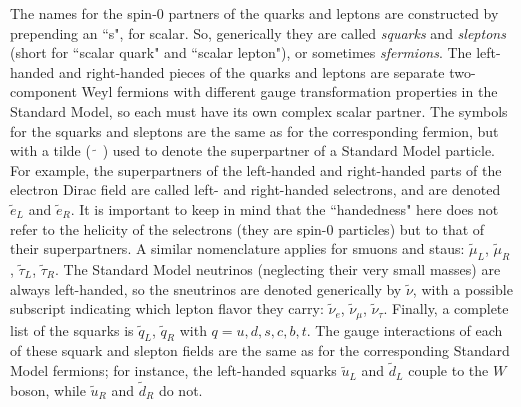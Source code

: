 \documentclass[12pt]{article}
\def\stilde{\widetilde}
\begin{document}
The names 
for the spin-0 partners of the quarks and leptons are constructed by 
prepending an ``s", for scalar. So, generically they are called {\it 
squarks} and {\it sleptons} (short for ``scalar quark" and ``scalar 
lepton"), or sometimes {\it sfermions}. 
The left-handed and right-handed pieces of the quarks and 
leptons are separate two-component Weyl fermions with different gauge 
transformation properties in the Standard Model, so each must have its own 
complex scalar partner. The symbols for the squarks and sleptons are the 
same as for the corresponding fermion, but with a tilde 
($\phantom{.}\stilde{\phantom{.}}\phantom{.}$) 
used to denote the superpartner of a Standard 
Model particle. For example, the superpartners of the left-handed and 
right-handed parts of the electron Dirac field are called left- and 
right-handed selectrons, and are denoted $\stilde e_L$ and $\stilde e_R$. 
It is important to keep in mind that the ``handedness" here does not refer 
to the helicity of the selectrons (they are spin-0 particles) but to that 
of their superpartners. A similar nomenclature applies for smuons and 
staus: $\stilde \mu_L$, $\stilde\mu_R$, $\stilde\tau_L$, $\stilde \tau_R$. 
The Standard Model neutrinos (neglecting their very small masses) are 
always left-handed, so the sneutrinos are denoted generically by 
$\stilde\nu$, with a possible subscript indicating which lepton flavor 
they carry: $\stilde\nu_e$, $\stilde\nu_\mu$, $\stilde\nu_\tau$. Finally, 
a complete list of the squarks is $\stilde q_L$, $\stilde q_R$ with 
$q=u,d,s,c,b,t$. The gauge interactions of each of these squark and 
slepton fields are the same as for the corresponding Standard Model 
fermions; for instance, the left-handed squarks $\stilde u_L$ and $\stilde 
d_L$ couple to the $W$ boson, while $\stilde u_R$ and $\stilde d_R$ do 
not.\setcounter{footnote}{1}
\end{document}
